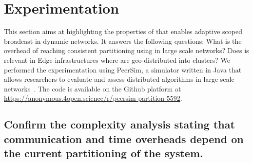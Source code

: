 
\vfill


\newpage

\section{Experimentation}
\label{sec:experimentation}

This section aims at highlighting the properties of \NAME that enables
adaptive scoped broadcast in dynamic networks. It answers the
following questions: What is the overhead of reaching consistent
partitioning using \NAME in large scale networks? Does \NAME is
relevant in Edge infrastructures where \processes are geo-distributed
into clusters? We performed the experimentation using PeerSim, a
simulator written in Java that allows researchers to evaluate and
assess distributed algorithms in large scale
networks~\cite{montresor2009peersim}. The code is available on the
Github platform at
\url{https://anonymous.4open.science/r/peersim-partition-5592}.

\subsection{Confirm the complexity analysis stating that
  communication and time overheads depend on the current partitioning
  of the system.}

